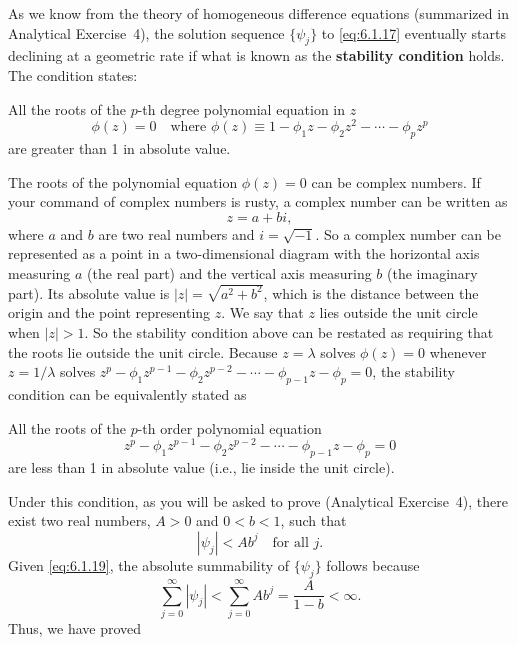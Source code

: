 As we know from the theory of homogeneous difference equations (summarized
in Analytical Exercise~4), the solution sequence $\{\psi_j\}$ to \eqref{eq:6.1.17} eventually
starts declining at a geometric rate if what is known as the \textbf{stability condition}
holds. The condition states:

All the roots of the $p$-th degree polynomial equation in $z$
\begin{equation}
  \phi(z) = 0 \quad \text{where } \phi(z) \equiv 1 - \phi_1 z - \phi_2 z^2 - \cdots - \phi_p z^p
  \label{eq:6.1.18}
\end{equation}
are greater than 1 in absolute value.

The roots of the polynomial equation $\phi(z) = 0$ can be complex numbers. If your
command of complex numbers is rusty, a complex number can be written as
\[
  z = a + bi,
\]
where $a$ and $b$ are two real numbers and $i = \sqrt{-1}$. So a complex number can
be represented as a point in a two-dimensional diagram with the horizontal axis
measuring $a$ (the real part) and the vertical axis measuring $b$ (the imaginary part).
Its absolute value is $|z| = \sqrt{a^2 + b^2}$, which is the distance between the origin and
the point representing $z$. We say that $z$ lies outside the unit circle when $|z| > 1$.
So the stability condition above can be restated as requiring that the roots lie
outside the unit circle. Because $z = \lambda$ solves $\phi(z) = 0$ whenever $z = 1/\lambda$ solves
$z^p - \phi_1 z^{p-1} - \phi_2 z^{p-2} - \cdots - \phi_{p-1} z - \phi_p = 0$, the stability condition can be
equivalently stated as

All the roots of the $p$-th order polynomial equation
\begin{equation}
  z^p - \phi_1 z^{p-1} - \phi_2 z^{p-2} - \cdots - \phi_{p-1} z - \phi_p = 0
  \label{eq:6.1.18prime}
  \tag{6.1.18$'$}
\end{equation}
are less than 1 in absolute value (i.e., lie inside the unit circle).

Under this condition, as you will be asked to prove (Analytical Exercise~4),
there exist two real numbers, $A > 0$ and $0 < b < 1$, such that
\begin{equation}
  |\psi_j| < A b^j \quad \text{for all } j.
  \label{eq:6.1.19}
\end{equation}
Given \eqref{eq:6.1.19}, the absolute summability of $\{\psi_j\}$ follows because
\[
  \sum_{j=0}^{\infty} |\psi_j| < \sum_{j=0}^{\infty} A b^j = \frac{A}{1 - b} < \infty.
\]
Thus, we have proved

